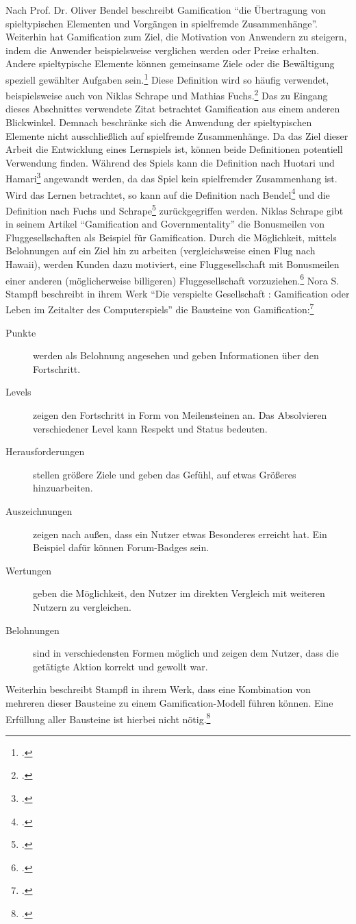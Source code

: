 	Nach Prof. Dr. Oliver Bendel beschreibt Gamification \enquote{die Übertragung von spieltypischen Elementen und Vorgängen in spielfremde Zusammenhänge}. Weiterhin hat Gamification zum Ziel, die Motivation von Anwendern zu steigern, indem die Anwender beispielsweise verglichen werden oder Preise erhalten. Andere spieltypische Elemente können gemeinsame Ziele oder die Bewältigung speziell gewählter Aufgaben sein.\footcite[\url{http://wirtschaftslexikon.gabler.de/Definition/gamification.html}]{gabler-gamification} Diese Definition wird so häufig verwendet, beispielsweise auch von Niklas Schrape und Mathias Fuchs.\footcite{gamification2}
	Das zu Eingang dieses Abschnittes verwendete Zitat betrachtet Gamification aus einem anderen Blickwinkel. Demnach beschränke sich die Anwendung der spieltypischen Elemente nicht ausschließlich auf spielfremde Zusammenhänge. Da das Ziel dieser Arbeit die Entwicklung eines Lernspiels ist, können beide Definitionen potentiell Verwendung finden. Während des Spiels kann die Definition nach Huotari und Hamari\footcite{gamification} angewandt werden, da das Spiel kein spielfremder Zusammenhang ist. Wird das Lernen betrachtet, so kann auf die Definition nach Bendel\footcite{gabler-gamification} und die Definition nach Fuchs und Schrape\footcite{gamification2} zurückgegriffen werden.
    Niklas Schrape gibt in seinem Artikel \enquote{Gamification and Governmentality} die Bonusmeilen von Fluggesellschaften als Beispiel für Gamification. Durch die Möglichkeit, mittels Belohnungen auf ein Ziel hin zu arbeiten (vergleichsweise einen Flug nach Hawaii), werden Kunden dazu motiviert, eine Fluggesellschaft mit Bonusmeilen einer anderen (möglicherweise billigeren) Fluggesellschaft vorzuziehen.\footcite[S.26ff]{gamification2}
    Nora S. Stampfl beschreibt in ihrem Werk \enquote{Die verspielte Gesellschaft : Gamification oder Leben im Zeitalter des Computerspiels} die Bausteine von Gamification:\footcite{stampfl2012verspielte}
    \begin{description}
    	\item[Punkte]{werden als Belohnung angesehen und geben Informationen über den Fortschritt.}
    	\item[Levels]{zeigen den Fortschritt in Form von Meilensteinen an. Das Absolvieren verschiedener Level kann Respekt und Status bedeuten.}
    	\item[Herausforderungen]{stellen größere Ziele und geben das Gefühl, auf etwas Größeres hinzuarbeiten.}
    	\item[Auszeichnungen]{zeigen nach außen, dass ein Nutzer etwas Besonderes erreicht hat. Ein Beispiel dafür können Forum-Badges sein.}
    	\item[Wertungen]{geben die Möglichkeit, den Nutzer im direkten Vergleich mit weiteren Nutzern zu vergleichen.}
    	\item[Belohnungen]{sind in verschiedensten Formen möglich und zeigen dem Nutzer, dass die getätigte Aktion korrekt und gewollt war.}
    \end{description}
    Weiterhin beschreibt Stampfl in ihrem Werk, dass eine Kombination von mehreren dieser Bausteine zu einem Gamification-Modell führen können. Eine Erfüllung aller Bausteine ist hierbei nicht nötig.\footcite{stampfl2012verspielte}


